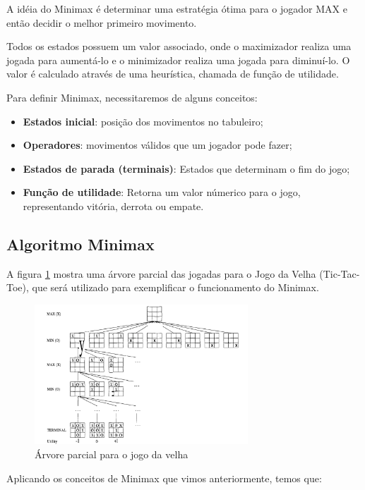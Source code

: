 \documentclass[sigplan,screen]{acmart}
\begin{document}
A idéia do Minimax é determinar uma estratégia ótima para o jogador MAX e então decidir o melhor primeiro movimento.

Todos os estados possuem um valor associado, onde o maximizador realiza uma jogada para aumentá-lo e o minimizador realiza uma jogada para diminuí-lo. 
O valor é calculado através de uma heurística, chamada de função de utilidade.

Para definir Minimax, necessitaremos de alguns conceitos:

\begin{itemize}
  \item \textbf{Estados inicial}: posição dos movimentos no tabuleiro;
  \item \textbf{Operadores}: movimentos válidos que um jogador pode fazer;
  \item \textbf{Estados de parada (terminais)}: Estados que determinam o fim do jogo;
  \item \textbf{Função de utilidade}: Retorna um valor númerico para o jogo, representando vitória, derrota ou empate.
\end{itemize}

\subsection{Algoritmo Minimax}

A figura \ref{ttt_parctree} mostra uma árvore parcial das jogadas para o Jogo da Velha (Tic-Tac-Toe), 
que será utilizado para exemplificar o funcionamento do Minimax.

\begin{figure}[h]
  \includegraphics[width=8cm]{tictactoe_tree.png}
  \caption{Árvore parcial para o jogo da velha}
  \label{ttt_parctree}
\end{figure}

Aplicando os conceitos de Minimax que vimos anteriormente, temos que:
\end{document}
